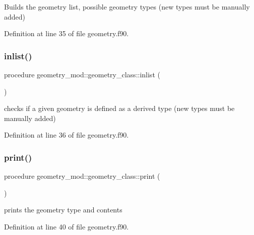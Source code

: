 Builds the geometry list, possible geometry types (new types must be manually added) 



Definition at line 35 of file geometry.\+f90.

\mbox{\label{structgeometry__mod_1_1geometry__class_a6dfcc19f822da875bebc58c3bf26e999}} 
\subsubsection{\texorpdfstring{inlist()}{inlist()}}
{\footnotesize\ttfamily procedure geometry\+\_\+mod\+::geometry\+\_\+class\+::inlist (\begin{DoxyParamCaption}{ }\end{DoxyParamCaption})\hspace{0.3cm}{\ttfamily [private]}}



checks if a given geometry is defined as a derived type (new types must be manually added) 



Definition at line 36 of file geometry.\+f90.

\mbox{\label{structgeometry__mod_1_1geometry__class_afbb83bea5cd3f73708b448d3c732ea7c}} 
\subsubsection{\texorpdfstring{print()}{print()}}
{\footnotesize\ttfamily procedure geometry\+\_\+mod\+::geometry\+\_\+class\+::print (\begin{DoxyParamCaption}{ }\end{DoxyParamCaption})\hspace{0.3cm}{\ttfamily [private]}}



prints the geometry type and contents 



Definition at line 40 of file geometry.\+f90.



